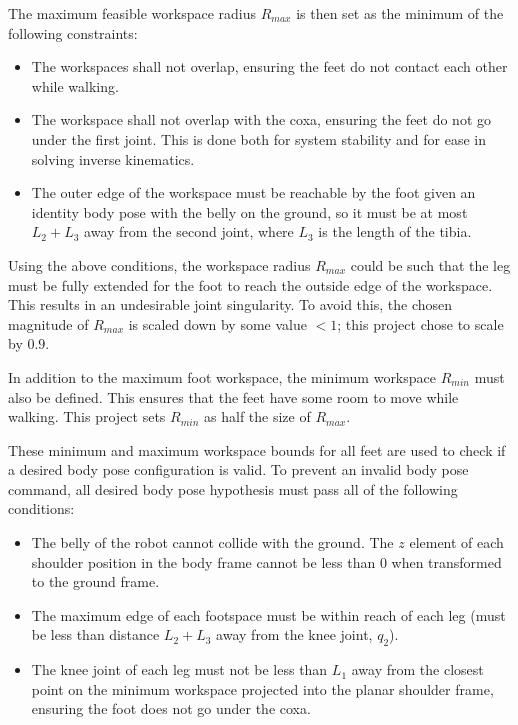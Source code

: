 The maximum feasible workspace radius $R_{max}$ is then set as the minimum of the following constraints:

\begin{itemize}
    \item The workspaces shall not overlap, ensuring the feet do not contact each other while walking. 
    \item The workspace shall not overlap with the coxa, ensuring the feet do not go under the first joint. This is done both for system stability and for ease in solving inverse kinematics. 
    \item The outer edge of the workspace must be reachable by the foot given an identity body pose with the belly on the ground, so it must be at most $L_2 + L_3$ away from the second joint, where $L_3$ is the length of the tibia. 
\end{itemize}

Using the above conditions, the workspace radius $R_{max}$ could be such that the leg must be fully extended for the foot to reach the outside edge of the workspace. This results in an undesirable joint singularity. To avoid this, the chosen magnitude of $R_{max}$ is scaled down by some value $<1$; this project chose to scale by $0.9$.

In addition to the maximum foot workspace, the minimum workspace $R_{min}$ must also be defined. This ensures that the feet have some room to move while walking. This project sets $R_{min}$ as half the size of $R_{max}$. 

These minimum and maximum workspace bounds for all feet are used to check if a desired body pose configuration is valid. To prevent an invalid body pose command, all desired body pose hypothesis must pass all of the following conditions:

\begin{itemize}
    \item The belly of the robot cannot collide with the ground. The $z$ element of each shoulder position in the body frame cannot be less than 0 when transformed to the ground frame. 
    \item The maximum edge of each footspace must be within reach of each leg (must be less than distance $L_2 + L_3$ away from the knee joint, $q_2$).
    \item The knee joint of each leg must not be less than $L_1$ away from the closest point on the minimum workspace projected into the planar shoulder frame, ensuring the foot does not go under the coxa.
\end{itemize}

